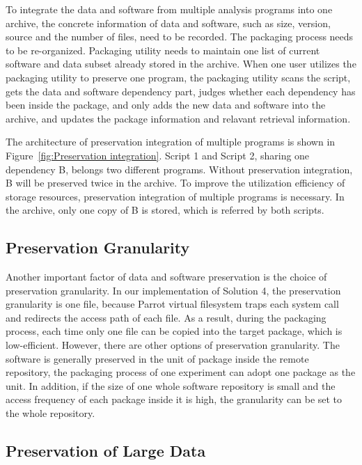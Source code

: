 \documentclass{sig-alternate}
\begin{document}
To integrate the data and software from multiple analysis programs into one
archive, the concrete information of data and software, such as size, version,
source and the number of files, need to be recorded. 
The packaging
process needs to be re-organized. Packaging utility needs to maintain one list
of current software and data subset already stored in the archive. When one
user utilizes the packaging utility to preserve one program, the
packaging utility scans the script, gets the data and software dependency
part, judges whether each dependency has been inside the package, and only adds
the new data and software into the archive, and updates the package information
and relavant retrieval information.

The architecture of preservation integration of multiple programs is shown in
Figure~\ref{fig:Preservation integration}. Script 1 and Script 2, sharing one
dependency B, belongs two different programs. Without preservation
integration, B will be preserved twice in the archive. To improve the utilization efficiency of storage resources,
preservation integration of multiple programs is necessary. In the archive,
only one copy of B is stored, which is referred by both scripts.

\subsection{Preservation Granularity}

Another important factor of data and software preservation is the choice of
preservation granularity. In our implementation of Solution 4, the preservation granularity is one
file, because Parrot virtual filesystem traps each system call and redirects
the access path of each file. As a result, during the packaging process, each
time only one file can be copied into the target package, which is
low-efficient. However, there are other options of preservation granularity.
The software is generally preserved in the unit of package inside the remote
repository, the packaging process of one experiment can adopt one package as
the unit. In addition, if the size of one whole software repository is small
and the access frequency of each package inside it is high, the granularity can
be set to the whole repository.

\subsection{Preservation of Large Data}
\end{document}

